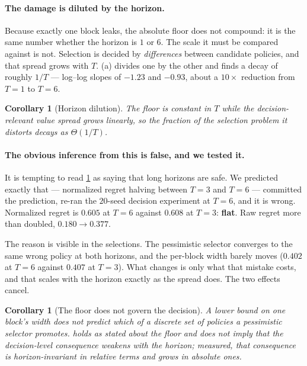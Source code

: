 \documentclass{article}
\theoremstyle{plain}
\newtheorem{corollary}[proposition]{Corollary}
\theoremstyle{definition}
\begin{document}
\paragraph{The damage is diluted by the horizon.} Because exactly one block
leaks, the absolute floor does not compound: it is the same number whether the
horizon is $1$ or $6$. The scale it must be compared against is not. Selection is
decided by \emph{differences} between candidate policies, and that spread grows
with $T$. (a) divides one by the other and finds a decay of
roughly $1/T$ --- log--log slopes of $-1.23$ and $-0.93$, about a $10\times$
reduction from $T=1$ to $T=6$.

\begin{corollary}[Horizon dilution]
\label{cor:dilution}
The floor is constant in $T$ while the decision-relevant value spread grows
linearly, so the fraction of the selection problem it distorts decays as
$\Theta(1/T)$.
\end{corollary}

\paragraph{The obvious inference from this is false, and we tested it.} It is
tempting to read \cref{cor:dilution} as saying that long horizons are safe. We
predicted exactly that --- normalized regret halving between $T=3$ and $T=6$ ---
committed the prediction, re-ran the $20$-seed decision experiment at $T=6$, and
it is wrong. Normalized regret is $0.605$ at $T=6$ against $0.608$ at $T=3$:
\textbf{flat}. Raw regret more than doubled, $0.180 \to 0.377$.

The reason is visible in the selections. The pessimistic selector converges to
the same wrong policy at both horizons, and the per-block width barely moves
($0.402$ at $T=6$ against $0.407$ at $T=3$). What changes is only what that
mistake costs, and that scales with the horizon exactly as the spread does. The
two effects cancel.

\begin{corollary}[The floor does not govern the decision]
\label{cor:nogovern}
A lower bound on one block's width does not predict which of a discrete set of
policies a pessimistic selector promotes.  holds as stated
about the floor and does \emph{not} imply that the decision-level consequence
weakens with the horizon; measured, that consequence is horizon-invariant in
relative terms and grows in absolute ones.
\end{corollary}
\end{document}
